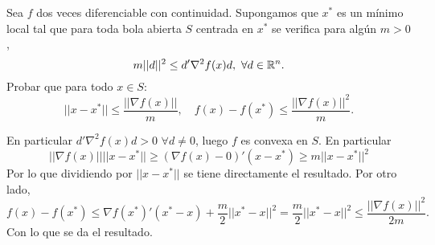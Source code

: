 \documentclass[twoside]{article}
\begin{document}
\newpage

\begin{ejercicio}{8}
Sea $f$ dos veces diferenciable con continuidad. Supongamos que $x^*$ es un mínimo local tal que para toda bola abierta $S$ centrada en $x^*$ se verifica para algún $m>0$,
$$m||d||^2\leq d'\nabla^2f(x)d,\ \forall d\in\mathbb{R}^n.$$
Probar que para todo $x\in S$:
$$||x-x^*||\leq\frac{||\nabla f(x)||}{m},\quad f(x)-f(x^*)\leq\frac{||\nabla f(x)||^2}{m}.$$
\end{ejercicio}
\begin{solucion} En particular $d'\nabla^2f(x)d >0$ $\forall d\neq 0$, luego $f$ es convexa en $S$. En particular
$$||\nabla f(x)||||x-x^*||\geq (\nabla f(x)-0)'(x-x^*)\geq m||x-x^*||^2$$
Por lo que dividiendo por $||x-x^*||$ se tiene directamente el resultado. Por otro lado,
$$f(x)-f(x^*)\leq \nabla f(x^*)'(x^*-x)+\frac{m}{2}||x^*-x||^2=\frac{m}{2}||x^*-x||^2\leq \frac{||\nabla f(x)||^2}{2m}.$$
Con lo que se da el resultado.
\end{solucion}
\end{document}
